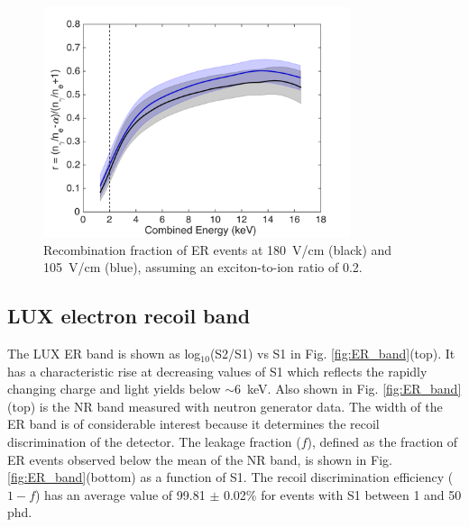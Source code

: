 \begin{figure}[h!]
\includegraphics[width=90mm]{fig/recombination.png}
\caption{Recombination fraction of ER events at 180~V/cm (black) and 105~V/cm (blue), assuming an exciton-to-ion ratio of 0.2.}
\label{fig:recombination}
\end{figure}

\subsection{LUX electron recoil band}

The LUX ER band is shown as log$_{10}$(S2/S1) vs S1 in Fig. \ref{fig:ER_band}(top).  It has a characteristic rise at decreasing values of S1 which reflects the rapidly changing charge and light yields below $\sim$6~keV.  Also shown in Fig. \ref{fig:ER_band}(top) is the NR band measured with neutron generator data\cite{DD-paper, lux-reanalysis}. The width of the ER band is of considerable interest because it determines the recoil discrimination of the detector. The leakage fraction ($f$), defined as the fraction of ER events observed below the mean of the NR band, is shown in Fig. \ref{fig:ER_band}(bottom) as a function of S1. The recoil discrimination efficiency ($1-f$) has an average value of 99.81 $\pm$ 0.02\% for events with S1 between 1 and 50 phd.

